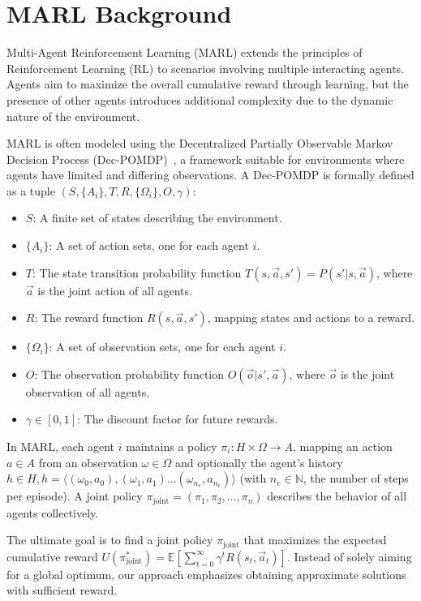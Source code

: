 \section{MARL Background}\label{sec:marl_background}

Multi-Agent Reinforcement Learning (MARL) extends the principles of Reinforcement Learning (RL) to scenarios involving multiple interacting agents. Agents aim to maximize the overall cumulative reward through learning, but the presence of other agents introduces additional complexity due to the dynamic nature of the environment.

MARL is often modeled using the Decentralized Partially Observable Markov Decision Process (Dec-POMDP)~\cite{Beynier2013}, a framework suitable for environments where agents have limited and differing observations. A Dec-POMDP is formally defined as a tuple $(S, \{A_i\}, T, R, \{\Omega_i\}, O, \gamma)$:

\begin{itemize}
    \item $S$: A finite set of states describing the environment.
    \item $\{A_i\}$: A set of action sets, one for each agent $i$.
    \item $T$: The state transition probability function $T(s, \vec{a}, s') = P(s'|s, \vec{a})$, where $\vec{a}$ is the joint action of all agents.
    \item $R$: The reward function $R(s, \vec{a}, s')$, mapping states and actions to a reward.
    \item $\{\Omega_i\}$: A set of observation sets, one for each agent $i$.
    \item $O$: The observation probability function $O(\vec{o} | s', \vec{a})$, where $\vec{o}$ is the joint observation of all agents.
    \item $\gamma \in [0,1]$: The discount factor for future rewards.
\end{itemize}

In MARL, each agent $i$ maintains a policy $\pi_i: H \times \Omega \rightarrow A$, mapping an action $a \in A$ from an observation $\omega \in \Omega$ and optionally the agent's history $h \in H, h=\langle(\omega_0,a_0),(\omega_1,a_1)\dots(\omega_{n_e},a_{n_e})\rangle$ (with $n_e \in \mathbb{N}$, the number of steps per episode). A joint policy $\pi_{\text{joint}} = (\pi_1, \pi_2, \ldots, \pi_n)$ describes the behavior of all agents collectively.

The ultimate goal is to find a joint policy $\pi_{\text{joint}}$ that maximizes the expected cumulative reward $U(\pi^*_{\text{joint}}) = \mathbb{E}\left[\sum_{t=0}^{\infty} \gamma^t R(s_t, \vec{a}_t)\right]$. Instead of solely aiming for a global optimum, our approach emphasizes obtaining approximate solutions with sufficient reward.

